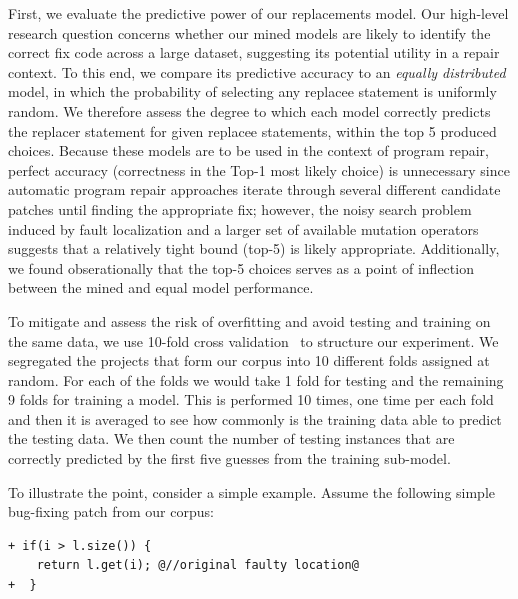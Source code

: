 \documentclass[conference]{IEEEtran}
\begin{document}
First, we evaluate the predictive power of our 
replacements model. Our high-level research question concerns whether 
our mined models are likely to identify the correct fix code across a large
dataset, suggesting its potential utility in a repair context.  To this end, we
compare its predictive accuracy to an \emph{equally distributed} model, in which
the probability of selecting any replacee statement is uniformly random. 
We therefore assess the degree to which each model correctly predicts the
replacer statement for given replacee statements, within the top 5 produced
choices.  Because these models are to be used in the context of program repair,
perfect accuracy (correctness in the Top-1 most likely choice) is unnecessary since automatic program repair approaches iterate through several different candidate patches until finding the appropriate fix;
however, the noisy search problem induced by fault localization and a larger set
of available mutation operators suggests that a relatively tight bound (top-5)
is likely appropriate.  Additionally, we found obserationally that the top-5
choices serves as a point of inflection between the mined and equal model
performance. 

To mitigate and assess the risk of overfitting and avoid testing and training on
the same data, we use 
10-fold cross validation~\cite{kohavi95} to structure our experiment. 
We segregated the projects that form our corpus into 10 
different folds assigned at random. For each of the 
folds we would take 1 fold for testing and the remaining 9 folds for training a model. 
This is performed 10 times, one time per each fold and then it is 
averaged to see how commonly is the training data able to predict the testing 
data.
We then count the number of testing instances that are correctly predicted 
by the first five guesses from the training sub-model.   


To illustrate the point, consider a simple example. Assume the following
simple bug-fixing patch from our corpus: 

\begin{lstlisting}[frame=single,style=base]
+ if(i > l.size()) {
    return l.get(i); @//original faulty location@
+  }    
\end{lstlisting}
\end{document}

